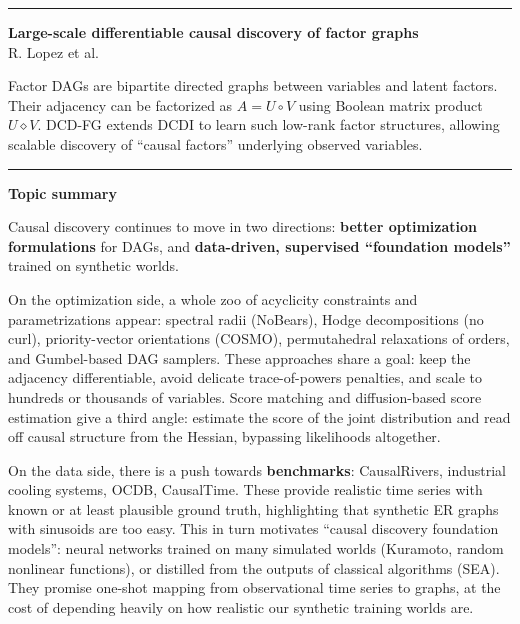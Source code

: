 \documentclass[a5paper]{article}
\def\subsection#1{{\par\bigskip\goodbreak\large\bfseries #1\par}}
\begin{document}
\begin{center}\rule{0.5\linewidth}{0.5pt}\end{center}

\textbf{Large-scale differentiable causal discovery of factor graphs}\\
R. Lopez et al.

Factor DAGs are bipartite directed graphs between variables and latent
factors. Their adjacency can be factorized as $A = U\circ V$ using Boolean
matrix product $U\diamond V$. DCD-FG extends DCDI to learn such low-rank factor
structures, allowing scalable discovery of ``causal factors'' underlying
observed variables.

\begin{center}\rule{0.5\linewidth}{0.5pt}\end{center}

\subsection{Topic summary}\label{topic-summary-4}

Causal discovery continues to move in two directions: \textbf{better
optimization formulations} for DAGs, and \textbf{data-driven, supervised
``foundation models''} trained on synthetic worlds.

On the optimization side, a whole zoo of acyclicity constraints and
parametrizations appear: spectral radii (NoBears), Hodge decompositions
(no curl), priority-vector orientations (COSMO), permutahedral
relaxations of orders, and Gumbel-based DAG samplers. These approaches
share a goal: keep the adjacency differentiable, avoid delicate
trace-of-powers penalties, and scale to hundreds or thousands of
variables. Score matching and diffusion-based score estimation give a
third angle: estimate the score of the joint distribution and read off
causal structure from the Hessian, bypassing likelihoods altogether.

On the data side, there is a push towards \textbf{benchmarks}:
CausalRivers, industrial cooling systems, OCDB, CausalTime. These
provide realistic time series with known or at least plausible ground
truth, highlighting that synthetic ER graphs with sinusoids are too
easy. This in turn motivates ``causal discovery foundation models'':
neural networks trained on many simulated worlds (Kuramoto, random
nonlinear functions), or distilled from the outputs of classical
algorithms (SEA). They promise one-shot mapping from observational time
series to graphs, at the cost of depending heavily on how realistic our
synthetic training worlds are.
\end{document}
